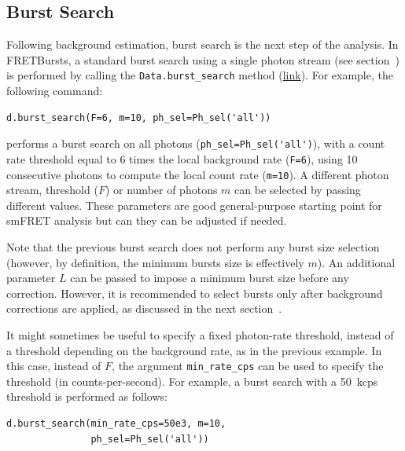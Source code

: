\documentclass[10pt,letterpaper]{article}
\begin{document}
\subsection*{Burst Search}
\label{sec:burstsearch}


Following background estimation, burst search is the next step of
the analysis.
In FRETBursts, a standard burst search using a single photon stream
(see section~) is performed by calling the
\verb|Data.burst_search| method
(\href{http://fretbursts.readthedocs.org/en/latest/data_class.html#fretbursts.burstlib.Data.burst_search}{link}).
For example, the following command:

\begin{lstlisting}
d.burst_search(F=6, m=10, ph_sel=Ph_sel('all'))
\end{lstlisting}

performs a burst search on all photons
(\verb|ph_sel=Ph_sel('all')|), with a count rate threshold equal to 6 times the
local background rate (\verb|F=6|), using 10 consecutive photons to compute the
local count rate (\verb|m=10|).
A different photon stream, threshold ($F$) or number of photons $m$ can be selected
by passing different values.
These parameters are good general-purpose starting point for smFRET analysis
but can they can be adjusted if needed.

Note that the previous burst search does not perform any burst size selection
(however, by definition, the minimum bursts size is effectively $m$).
An additional parameter $L$ can be passed to impose a minimum burst
size before any correction.
However, it is recommended to select bursts only after background corrections
are applied, as discussed in the next section~.

It might sometimes be useful to specify a fixed photon-rate threshold, instead
of a threshold depending on the background rate, as in the previous example. In
this case, instead of $F$, the argument \verb|min_rate_cps| can be used to
specify the threshold (in counts-per-second). For example, a burst search with
a 50~kcps threshold is performed as follows:

\begin{lstlisting}
d.burst_search(min_rate_cps=50e3, m=10,
               ph_sel=Ph_sel('all'))
\end{lstlisting}
\end{document}
